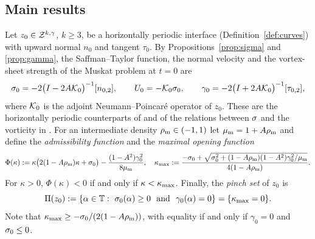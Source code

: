 \subsection{Main results}
Let $z_0\in\mathcal{Z}^{k,\gamma}$, $k\ge3$, be a horizontally periodic interface (Definition~\ref{def:curves}) with upward normal $n_0$ and tangent $\tau_0$. By Propositions~\ref{prop:sigma}
and \ref{prop:gamma}, the Saffman--Taylor function, the normal velocity and the vortex-sheet strength of the Muskat problem at $t=0$ are
\begin{equation}\label{eq:data}
\sigma_0=-2\big(I-2A\mathcal{K}_0\big)^{-1}[n_{0,2}],\qquad U_0=-\mathcal{K}_0\sigma_0,\qquad \gamma_0=-2\big(I+2A\mathcal{K}_0\big)^{-1}[\tau_{0,2}],
\end{equation}
where $\mathcal{K}_0$ is the adjoint Neumann--Poincar\'e operator of $z_0$. These are the horizontally periodic counterparts of \cite[(5.12)--(5.13)]{LM26} and of the relations between $\sigma$ and
the vorticity in \cite[(3.7b) and Sec.~3.1.3]{LM26}. For an intermediate density $\rho_{\mathrm m}\in(-1,1)$ let $\mu_{\mathrm m}=1+A\rho_{\mathrm m}$ and define the \emph{admissibility function} and the
\emph{maximal opening function}
\begin{equation}\label{eq:Phi}
\Phi(\kappa):=\kappa\big(2(1-A\rho_{\mathrm m})\kappa+\sigma_0\big)-\frac{(1-A^2)\gamma_0^2}{8\mu_{\mathrm m}},\quad
\kappa_{\max}:=\frac{-\sigma_0+\sqrt{\sigma_0^2+(1-A\rho_{\mathrm m})(1-A^2)\gamma_0^2/\mu_{\mathrm m}}}{4(1-A\rho_{\mathrm m})} .
\end{equation}
For $\kappa>0$, $\Phi(\kappa)<0$ if and only if $\kappa<\kappa_{\max}$. Finally, the \emph{pinch set} of $z_0$ is
\[
\Pinch(z_0):=\{\alpha\in\T:\ \sig_0(\alpha)\ge0\ \text{ and }\ \gamma_0(\alpha)=0\}=\{\kmax=0\}.
\]
Note that $\kappa_{\max}\ge-\sigma_0/(2(1-A\rho_{\mathrm m}))$, with equality if and only if $\gamma_0=0$ and $\sigma_0\le0$.

